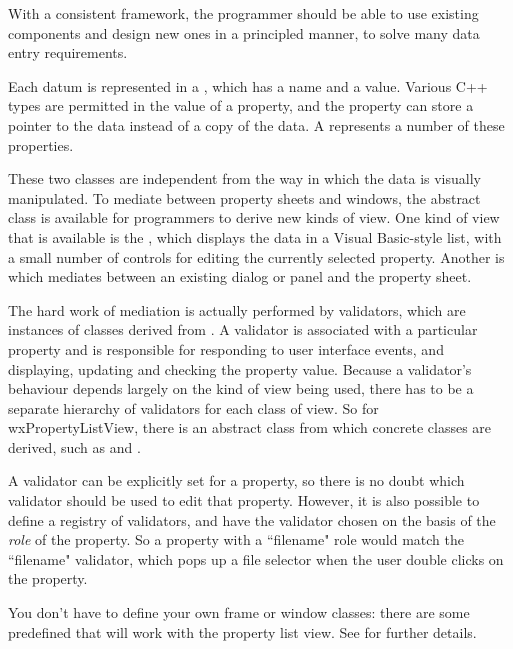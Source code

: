 With a consistent framework, the programmer should be able to use existing
components and design new ones in a principled manner, to solve many data entry
requirements.

Each datum is represented in a , which has a name and a value.
Various C++ types are permitted in the value of a property, and the property can store a pointer
to the data instead of a copy of the data. A  represents a number of these properties.

These two classes are independent from the way in which the data is visually manipulated. To
mediate between property sheets and windows, the abstract class  is
available for programmers to derive new kinds of view. One kind of view that is available is the ,
which displays the data in a Visual Basic-style list, with a small number of controls for editing
the currently selected property. Another is  which
mediates between an existing dialog or panel and the property sheet.

The hard work of mediation is actually performed by validators, which are instances of classes
derived from . A validator is associated with
a particular property and is responsible for
responding to user interface events, and displaying, updating and checking the property value.
Because a validator's behaviour depends largely on the kind of view being used, there has to be
a separate hierarchy of validators for each class of view. So for wxPropertyListView, there is
an abstract class  from which concrete
classes are derived, such as  and
\rtfsp{}.

A validator can be explicitly set for a property, so there is no doubt which validator
should be used to edit that property. However, it is also possible to define a registry
of validators, and have the validator chosen on the basis of the {\it role} of the property.
So a property with a ``filename" role would match the ``filename" validator, which pops
up a file selector when the user double clicks on the property.

You don't have to define your own frame or window classes: there are some predefined
that will work with the property list view. See  for
further details.


